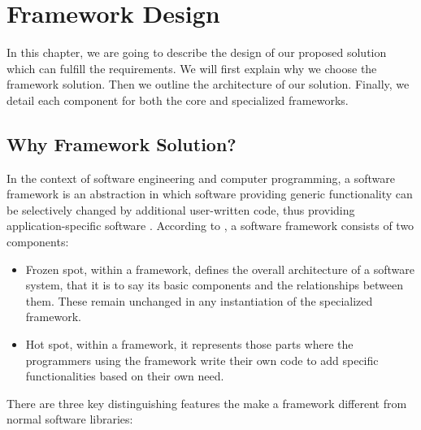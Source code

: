 \chapter{Framework Design}
\label{chap:fw-design}


In this chapter, we are going to describe the design of our proposed solution
which can fulfill the requirements.
We will first explain why we choose the framework solution. Then we outline the 
architecture of our solution. Finally, we detail each component for both the 
core and specialized frameworks.

\section{Why Framework Solution?}
\label{sec:fw-design-why}

In the context of software engineering and computer programming, a software
framework is an abstraction in which software providing generic functionality
can be selectively changed by additional user-written code, thus providing
application-specific software \cite{wikipedia-software-framework}.
According to \cite{software-framework-def}, a software framework consists of
two components:

\begin{itemize}
    \item Frozen spot, within a framework, defines the overall
    architecture of a software system, that it is to say its basic components
    and the relationships between them. These remain unchanged in any
    instantiation of the specialized framework.

    \item Hot spot, within a framework, it represents those parts where the
    programmers using the framework write their own code to add specific
    functionalities based on their own need.
\end{itemize}

There are three key distinguishing features the make a framework different from
normal software libraries:

